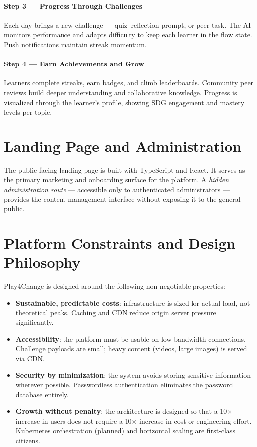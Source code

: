 \paragraph{Step 3 — Progress Through Challenges}
Each day brings a new challenge — quiz, reflection prompt, or peer task. The AI monitors performance and adapts difficulty to keep each learner in the flow state. Push notifications maintain streak momentum.

\paragraph{Step 4 — Earn Achievements and Grow}
Learners complete streaks, earn badges, and climb leaderboards. Community peer reviews build deeper understanding and collaborative knowledge. Progress is visualized through the learner's profile, showing SDG engagement and mastery levels per topic.

\section{Landing Page and Administration}
\label{sec:landing}

The public-facing landing page is built with TypeScript and React. It serves as the primary marketing and onboarding surface for the platform. A \emph{hidden administration route} — accessible only to authenticated administrators — provides the content management interface without exposing it to the general public.


\section{Platform Constraints and Design Philosophy}
\label{sec:philosophy}

Play4Change is designed around the following non-negotiable properties:

\begin{itemize}
    \item \textbf{Sustainable, predictable costs}: infrastructure is sized for actual load, not theoretical peaks. Caching and CDN reduce origin server pressure significantly.
    \item \textbf{Accessibility}: the platform must be usable on low-bandwidth connections. Challenge payloads are small; heavy content (videos, large images) is served via CDN.
    \item \textbf{Security by minimization}: the system avoids storing sensitive information wherever possible. Passwordless authentication eliminates the password database entirely.
    \item \textbf{Growth without penalty}: the architecture is designed so that a 10× increase in users does not require a 10× increase in cost or engineering effort. Kubernetes orchestration (planned) and horizontal scaling are first-class citizens.
\end{itemize}

